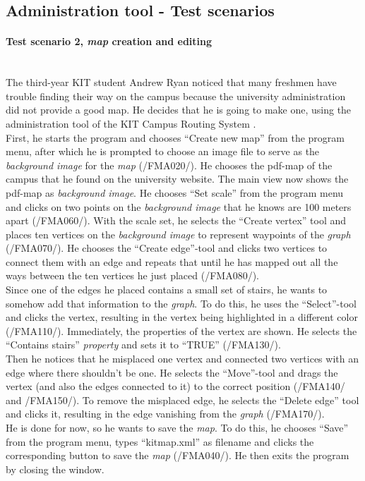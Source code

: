 \newpage
\subsection{Administration tool - Test scenarios}

\paragraph{Test scenario 2, \textit{map} creation and editing} ~\\
The third-year KIT student Andrew Ryan noticed that many freshmen have trouble finding their way on the campus because the university administration did not provide a good map. He decides that he is going to make one, using the administration tool of the KIT Campus Routing System \programName.\\
First, he starts the program and chooses ``Create new map'' from the program menu, after which he is prompted to choose an image file to serve as the \textit{background image} for the \textit{map} (/FMA020/). He chooses the pdf-map of the campus that he found on the university website.
The main view now shows the pdf-map as \textit{background image}. He chooses ``Set scale'' from the program menu and clicks on two points on the \textit{background image} that he knows are 100 meters apart (/FMA060/). With the scale set, he selects the ``Create vertex'' tool and places ten vertices on the
\textit{background image} to represent waypoints of the \textit{graph} (/FMA070/). He chooses the ``Create edge''-tool and clicks two vertices to connect them with an edge and repeats that until he has mapped out all the ways between the ten vertices he just placed (/FMA080/).\\
Since one of the edges he placed contains a small set of stairs, he wants to somehow add that information to the \textit{graph}. To do this, he uses the ``Select''-tool and clicks the vertex, resulting in the vertex being highlighted in a different color (/FMA110/). Immediately, the properties of the vertex are shown.
He selects the ``Contains stairs'' \textit{property} and sets it to ``TRUE'' (/FMA130/).\\
Then he notices that he misplaced one vertex and connected two vertices with an edge where there shouldn't be one. He selects the ``Move''-tool and drags the vertex (and also the edges connected to it) to the correct position (/FMA140/ and /FMA150/).
To remove the misplaced edge, he selects the ``Delete edge'' tool and clicks it, resulting in the edge vanishing from the \textit{graph} (/FMA170/). \\
He is done for now, so he wants to save the \textit{map}. To do this, he chooses ``Save'' from the program menu, types ``kitmap.xml'' as filename and clicks the corresponding button to save the \textit{map} (/FMA040/). He then exits the program by closing the window.

